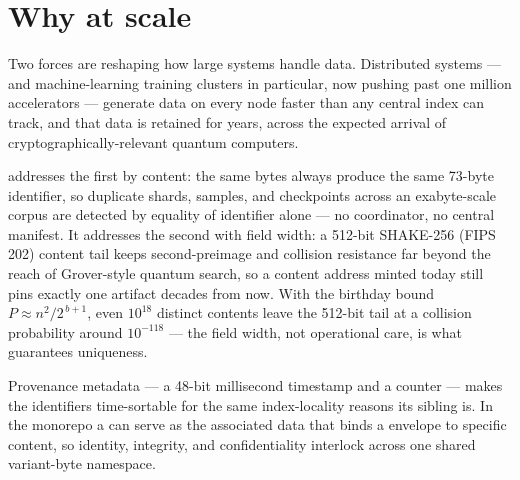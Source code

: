 \section{Why \tesserahash{} at scale}
\label{sec:why-hash}

Two forces are reshaping how large systems handle data. Distributed systems --- and machine-learning training clusters in particular, now pushing past one million accelerators --- generate data on every node faster than any central index can track, and that data is retained for years, across the expected arrival of cryptographically-relevant quantum computers.

\tesserahash{} addresses the first by content: the same bytes always produce the same 73-byte identifier, so duplicate shards, samples, and checkpoints across an exabyte-scale corpus are detected by equality of identifier alone --- no coordinator, no central manifest. It addresses the second with field width: a 512-bit SHAKE-256 (FIPS 202) content tail keeps second-preimage and collision resistance far beyond the reach of Grover-style quantum search, so a content address minted today still pins exactly one artifact decades from now. With the birthday bound $P \approx n^{2}/2^{\,b+1}$, even $10^{18}$ distinct contents leave the 512-bit tail at a collision probability around $10^{-118}$ --- the field width, not operational care, is what guarantees uniqueness.

Provenance metadata --- a 48-bit millisecond timestamp and a counter --- makes the identifiers time-sortable for the same index-locality reasons its sibling \tesseraid{} is. In the \tessera{} monorepo a \tesserahash{} can serve as the associated data that binds a \tesseraseal{} envelope to specific content, so identity, integrity, and confidentiality interlock across one shared variant-byte namespace.
